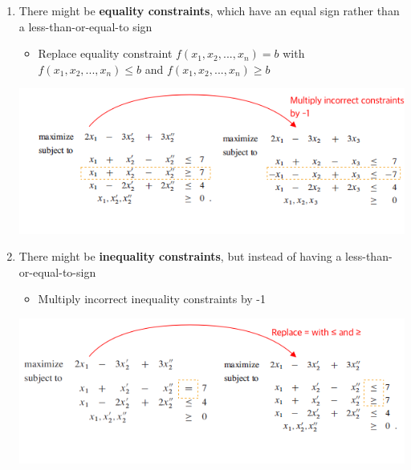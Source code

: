 \documentclass[12pt]{article}
\begin{document}
\begin{enumerate}[1.]
\begin{itemize}
\begin{enumerate}[1)]
            \item There might be \textbf{equality constraints}, which have an equal sign rather than a
            less-than-or-equal-to sign

            \begin{itemize}
                \item Replace equality constraint $f(x_1, x_2, ..., x_n) = b$ with
                $f(x_1, x_2, ..., x_n) \leq b$ and $f(x_1, x_2, ..., x_n) \geq b$
            \end{itemize}

            \begin{center}
            \includegraphics[width=0.9\linewidth]{images/worksheet_6_solution_5.png}
            \end{center}

            \item There might be \textbf{inequality constraints}, but instead of having a less-than-or-equal-to-sign

            \begin{itemize}
                \item Multiply incorrect inequality constraints by -1
            \end{itemize}

            \begin{center}
            \includegraphics[width=0.9\linewidth]{images/worksheet_6_solution_4.png}
            \end{center}


        \end{enumerate}


\end{itemize}
\end{enumerate}
\end{document}
